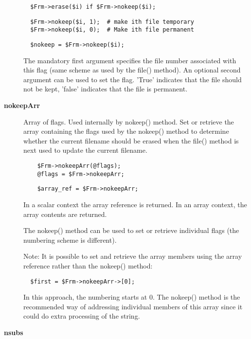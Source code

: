 \begin{description}
\begin{verbatim}
  $Frm->erase($i) if $Frm->nokeep($i);
\end{verbatim}
\begin{verbatim}
  $Frm->nokeep($i, 1);  # make ith file temporary
  $Frm->nokeep($i, 0);  # Make ith file permanent
\end{verbatim}
\begin{verbatim}
  $nokeep = $Frm->nokeep($i);
\end{verbatim}


The mandatory first argument specifies the file number associated with
this flag (same scheme as used by the file() method). An optional
second argument can be used to set the flag. 'True' indicates that the
file should not be kept, 'false' indicates that the file is permanent.

\item[\textbf{nokeepArr}] \mbox{}

Array of flags. Used internally by nokeep() method.  Set or retrieve
the array containing the flags used by the nokeep() method to
determine whether the current filename should be erased when the
file() method is next used to update the current filename.

\begin{verbatim}
    $Frm->nokeepArr(@flags);
    @flags = $Frm->nokeepArr;
\end{verbatim}
\begin{verbatim}
    $array_ref = $Frm->nokeepArr;
\end{verbatim}


In a scalar context the array reference is returned.
In an array context, the array contents are returned.



The nokeep() method can be used to set or retrieve individual
flags (the numbering scheme is different).



Note: It is possible to set and retrieve the array members using
the array reference rather than the nokeep() method:

\begin{verbatim}
  $first = $Frm->nokeepArr->[0];
\end{verbatim}


In this approach, the numbering starts at 0. The nokeep() method
is the recommended way of addressing individual members of this
array since it could do extra processing of the
string.

\item[\textbf{nsubs}] \mbox{}


\end{description}
